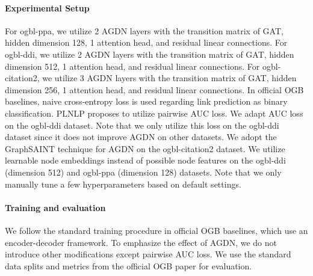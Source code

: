 \documentclass{article}
\begin{document}
\paragraph{Experimental Setup}
For ogbl-ppa, we utilize 2 AGDN layers with the transition matrix of GAT, hidden dimension 128, 1 attention head, and residual linear connections. For ogbl-ddi, we utilize 2 AGDN layers with the transition matrix of GAT, hidden dimension 512, 1 attention head, and residual linear connections. For ogbl-citation2, we utilize 3 AGDN layers with the transition matrix of GAT, hidden dimension 256, 1 attention head, and residual linear connections. In official OGB baselines, naive cross-entropy loss is used regarding link prediction as binary classification. PLNLP proposes to utilize pairwise AUC loss. We adapt AUC loss on the ogbl-ddi dataset. Note that we only utilize this loss on the ogbl-ddi dataset since it does not improve AGDN on other datasets. We adopt the GraphSAINT technique for AGDN on the ogbl-citation2 dataset. We utilize learnable node embeddings instead of possible node features on the ogbl-ddi (dimension 512) and ogbl-ppa (dimension 128) datasets. Note that we only manually tune a few hyperparameters based on default settings.

\paragraph{Training and evaluation}
We follow the standard training procedure in official OGB baselines, which use an encoder-decoder framework. To emphasize the effect of AGDN, we do not introduce other modifications except pairwise AUC loss. We use the standard data splits and metrics from the official OGB paper for evaluation.
\end{document}
